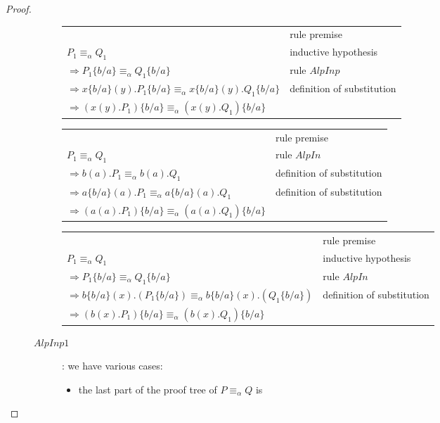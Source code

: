 \begin{lemma}
\begin{proof}
\begin{description}
\begin{description}
\begin{center}
	      \begin{tabular}{ll}
		  &
		    rule premise
		\\
		    $P_{1}\equiv_{\alpha}Q_{1}$
		  &
		    inductive hypothesis
		\\
		    $\Rightarrow P_{1}\{b/a\}\equiv_{\alpha}Q_{1}\{b/a\}$
		  &
		    rule $AlpInp$
		\\
		    $\Rightarrow x\{b/a\}(y).P_{1}\{b/a\}\equiv_{\alpha}x\{b/a\}(y).Q_{1}\{b/a\} $
		  &
		    definition of substitution
		\\
		    $\Rightarrow (x(y).P_{1})\{b/a\}\equiv_{\alpha}(x(y).Q_{1})\{b/a\} $
		  &
		\\
	      \end{tabular}
	    \end{center}	    	    
 	    \begin{center}
 	      \begin{tabular}{ll}
 		&rule premise\\
 		$P_{1}\equiv_{\alpha}Q_{1}$&rule $AlpIn$\\
 		$\Rightarrow b(a).P_{1}\equiv_{\alpha}b(a).Q_{1} $&definition of substitution\\
 		$\Rightarrow a\{b/a\}(a).P_{1}\equiv_{\alpha}a\{b/a\}(a).Q_{1} $&definition of substitution\\
 		$\Rightarrow (a(a).P_{1})\{b/a\}\equiv_{\alpha}(a(a).Q_{1})\{b/a\} $&\\
 	      \end{tabular}
 	    \end{center}	    	    
	    \begin{center}
	      \begin{tabular}{ll}
		&rule premise\\
		$P_{1}\equiv_{\alpha}Q_{1}$&inductive hypothesis\\
		$\Rightarrow P_{1}\{b/a\}\equiv_{\alpha}Q_{1}\{b/a\} $&rule $AlpIn$\\
		$\Rightarrow b\{b/a\}(x).(P_{1}\{b/a\})\equiv_{\alpha}b\{b/a\}(x).(Q_{1}\{b/a\}) $&definition of substitution\\
		$\Rightarrow (b(x).P_{1})\{b/a\}\equiv_{\alpha}(b(x).Q_{1})\{b/a\} $&\\
	      \end{tabular}
	    \end{center}	    	    
	  \item[$AlpInp1$]:
	    we have various cases:
	    \begin{itemize}
	      \item 
		the last part of the proof tree of $P\equiv_{\alpha}Q$ is

\end{itemize}
\end{description}
\end{description}
\end{proof}
\end{lemma}

